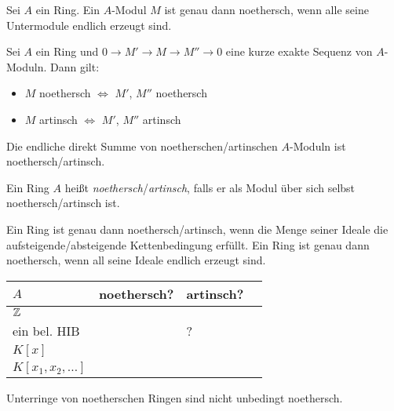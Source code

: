 \documentclass{cheat-sheet}
\newcommand{\cmark}{\ding{51}}
\newcommand{\xmark}{\ding{55}}
\begin{document}
\begin{prop}
  Sei $A$ ein Ring.
  Ein $A$-Modul $M$ ist genau dann noethersch, wenn alle seine Untermodule endlich erzeugt sind.
\end{prop}

\begin{prop}
  Sei $A$ ein Ring und $0 \to M' \to M \to M'' \to 0$ eine kurze exakte Sequenz von $A$-Moduln.
  Dann gilt:
  \begin{itemize}
    \item $M$ noethersch $\iff$ $M'$, $M''$ noethersch
    \item $M$ artinsch $\iff$ $M'$, $M''$ artinsch
  \end{itemize}
\end{prop}

\begin{kor}
  Die endliche direkt Summe von noetherschen/artinschen $A$-Moduln ist noethersch/artinsch.
\end{kor}


\begin{defn}
  Ein Ring $A$ heißt \emph{noethersch}/\emph{artinsch}, falls er als Modul über sich selbst noethersch/artinsch ist.
\end{defn}

\begin{bem}
  Ein Ring ist genau dann noethersch/artinsch, wenn die Menge seiner Ideale die aufsteigende/absteigende Kettenbedingung erfüllt.
  Ein Ring ist genau dann noethersch, wenn all seine Ideale endlich erzeugt sind.
\end{bem}

\begin{bspe}
  \begin{minipage}[t]{0.88 \linewidth}
    \begin{tabular}[t]{l | l | l | l}
      $A$ & noethersch? & artinsch? \\ \hline
      $\mathbb{Z}$ & \cmark & \xmark \\
      ein bel. HIB & \cmark & ? \\
      $K[x]$ & \cmark & \xmark \\
      $K[x_1, x_2, \ldots]$ & \xmark & \xmark
    \end{tabular}
  \end{minipage}
\end{bspe}

\begin{acht}
  Unterringe von noetherschen Ringen sind nicht unbedingt noethersch.
\end{acht}
\end{document}
